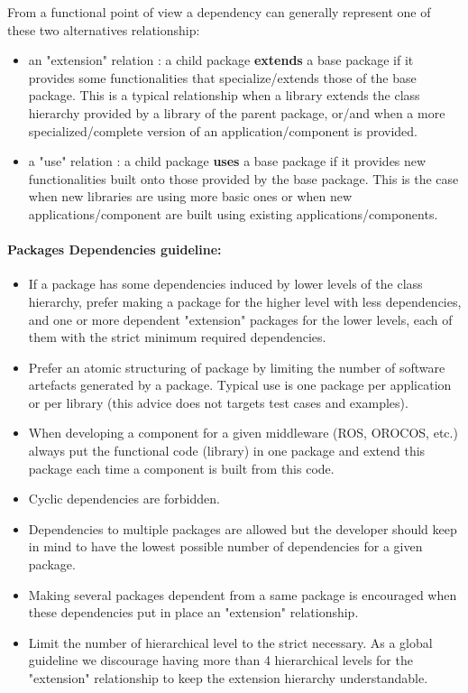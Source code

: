 \documentclass[12pt,a4paper]{article}
\begin{document}
From a functional point of view a dependency can generally represent one of these two alternatives relationship:
\begin{itemize}
\item an "extension" relation : a child package \textbf{extends} a base package if it provides some functionalities that specialize/extends those of the base package. This is a typical relationship when a library extends the class hierarchy provided by a library of the parent package, or/and when a more specialized/complete version of an application/component is provided.
\item a "use" relation : a child package \textbf{uses} a base package if it provides new functionalities built onto those provided by the base package. This is the case when new libraries are using more basic ones or when new applications/component are built using existing applications/components.
\end{itemize}


\paragraph{Packages Dependencies guideline:}
\begin{itemize}
\item If a package has some dependencies induced by lower levels of the class hierarchy, prefer making a package for the higher level with less dependencies, and one or more dependent "extension" packages for the lower levels, each of them with the strict minimum required dependencies.
\item Prefer an atomic structuring of package by limiting the number of software artefacts generated by a package. Typical use is one package per application or per library (this advice does not targets test cases and examples).
\item When developing a component for a given middleware (ROS, OROCOS, etc.) always put the functional code (library) in one package and extend this package each time a component is built from this code.
\item Cyclic dependencies are forbidden.
\item Dependencies to multiple packages are allowed but the developer should keep in mind to have the lowest possible number of dependencies for a given package.
\item Making several packages dependent from a same package is encouraged when these dependencies put in place an "extension" relationship.
\item Limit the number of hierarchical level to the strict necessary. As a global guideline we discourage having more than 4 hierarchical levels for the "extension" relationship to keep the extension hierarchy understandable. 
\end{itemize}
\end{document}
